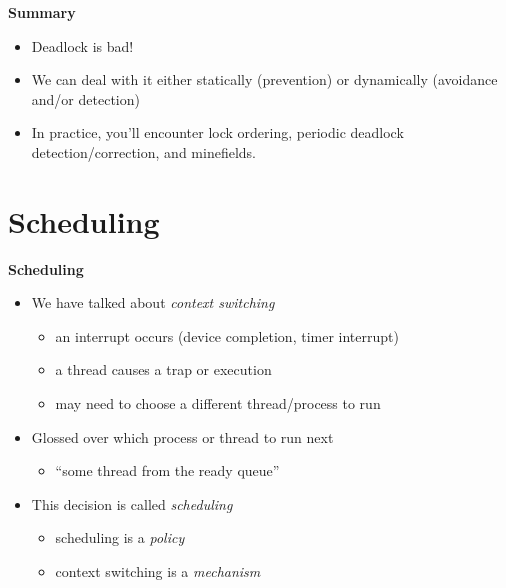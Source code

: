 \documentclass[11pt,a4paper]{article}
\begin{document}
\textbf{Summary}
\begin{itemize}
    \item Deadlock is bad!
    \item We can deal with it either statically (prevention)
        or dynamically (avoidance and/or detection)
    \item In practice, you'll encounter lock ordering, periodic deadlock detection/correction,
        and minefields.
\end{itemize}

\section{Scheduling}

\textbf{Scheduling}
\begin{itemize}
    \item We have talked about \emph{context switching}
        \begin{itemize}
            \item an interrupt occurs (device completion, timer interrupt)
            \item a thread causes a trap or execution
            \item may need to choose a different thread/process to run
        \end{itemize}
    \item Glossed over which process or thread to run next
        \begin{itemize}
            \item ``some thread from the ready queue''
        \end{itemize}
    \item This decision is called \emph{scheduling}
        \begin{itemize}
            \item scheduling is a \emph{policy}
            \item context switching is a \emph{mechanism}
        \end{itemize}
\end{itemize}
\end{document}
